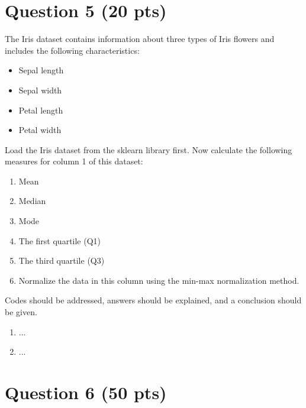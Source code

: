 \pagebreak
\begin{answer}
	
\end{answer}

\pagebreak
\section{Question 5 \normalsize(20 pts)}

\begin{question}
	The Iris dataset contains information about three types of Iris flowers and includes the following characteristics:
	\begin{itemize}
		\item Sepal length
		\item Sepal width
		\item Petal length
		\item Petal width
	\end{itemize}
	
	Load the Iris dataset from the sklearn library first. Now calculate the following measures for column 1 of this dataset:
	\begin{enumerate}
		\item Mean
		\item Median
		\item Mode
		\item The first quartile (Q1)
		\item The third quartile (Q3)
		\item Normalize the data in this column using the min-max normalization method.
	\end{enumerate}
\end{question}
\pagebreak
\begin{answer}
	Codes should be addressed, answers should be explained, and a conclusion should be given.
	\begin{enumerate}     
		\item ... 
		
		\item ... 
	\end{enumerate}
\end{answer}

\pagebreak
\section{Question 6 \normalsize(50 pts)}

